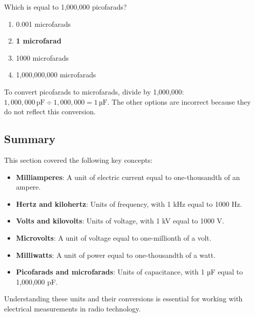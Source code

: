 \begin{tcolorbox}[colback=gray!10!white,colframe=black!75!black,title={T5B08}]
    Which is equal to 1,000,000 picofarads?
    \begin{enumerate}[label=\Alph*,noitemsep]
        \item 0.001 microfarads
        \item \textbf{1 microfarad}
        \item 1000 microfarads
        \item 1,000,000,000 microfarads
    \end{enumerate}
\end{tcolorbox}
To convert picofarads to microfarads, divide by 1,000,000: \(1,000,000 \, \text{pF} \div 1,000,000 = 1 \, \text{µF}\). The other options are incorrect because they do not reflect this conversion.

\subsection*{Summary}
This section covered the following key concepts:
\begin{itemize}
    \item \textbf{Milliamperes}: A unit of electric current equal to one-thousandth of an ampere.
    \item \textbf{Hertz and kilohertz}: Units of frequency, with 1 kHz equal to 1000 Hz.
    \item \textbf{Volts and kilovolts}: Units of voltage, with 1 kV equal to 1000 V.
    \item \textbf{Microvolts}: A unit of voltage equal to one-millionth of a volt.
    \item \textbf{Milliwatts}: A unit of power equal to one-thousandth of a watt.
    \item \textbf{Picofarads and microfarads}: Units of capacitance, with 1 µF equal to 1,000,000 pF.
\end{itemize}
Understanding these units and their conversions is essential for working with electrical measurements in radio technology.

